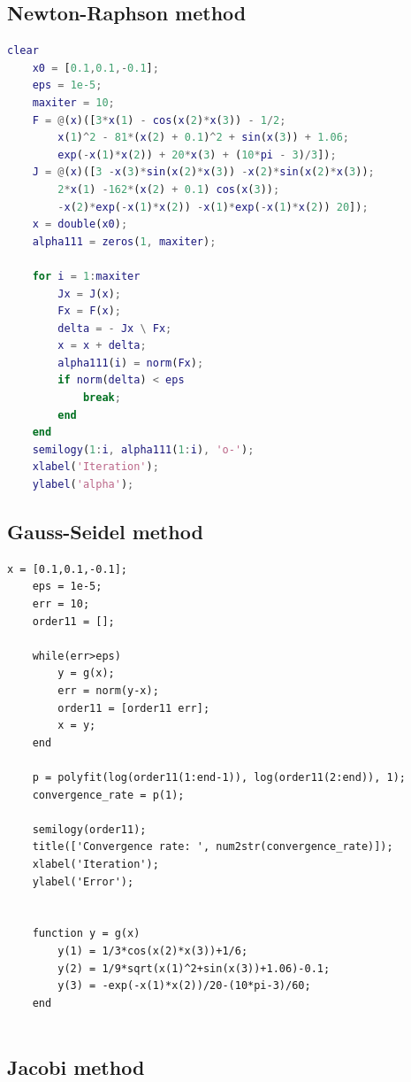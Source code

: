 \documentclass[12pt, a4paper, oneside]{ctexart}
\begin{document}
\begin{spacing}{2.0}
\subsection{Newton-Raphson method}
\begin{lstlisting}[language=Matlab, caption=Newton-Raphson method with Convergence speed for iterative methods] 
    clear
    x0 = [0.1,0.1,-0.1];
    eps = 1e-5;
    maxiter = 10;
    F = @(x)([3*x(1) - cos(x(2)*x(3)) - 1/2;
        x(1)^2 - 81*(x(2) + 0.1)^2 + sin(x(3)) + 1.06;
        exp(-x(1)*x(2)) + 20*x(3) + (10*pi - 3)/3]);
    J = @(x)([3 -x(3)*sin(x(2)*x(3)) -x(2)*sin(x(2)*x(3)); 
        2*x(1) -162*(x(2) + 0.1) cos(x(3));
        -x(2)*exp(-x(1)*x(2)) -x(1)*exp(-x(1)*x(2)) 20]);
    x = double(x0);
    alpha111 = zeros(1, maxiter);
    
    for i = 1:maxiter
        Jx = J(x);
        Fx = F(x);
        delta = - Jx \ Fx;
        x = x + delta;
        alpha111(i) = norm(Fx);
        if norm(delta) < eps
            break;
        end
    end
    semilogy(1:i, alpha111(1:i), 'o-');
    xlabel('Iteration');
    ylabel('alpha');    
\end{lstlisting}
\subsection{Gauss-Seidel method}
\begin{lstlisting}[caption=Gauss-Seidel method with Convergence speed for iterative methods] 
    x = [0.1,0.1,-0.1];
    eps = 1e-5;
    err = 10;
    order11 = [];
    
    while(err>eps)
        y = g(x);
        err = norm(y-x);
        order11 = [order11 err];
        x = y;
    end
    
    p = polyfit(log(order11(1:end-1)), log(order11(2:end)), 1);
    convergence_rate = p(1);
    
    semilogy(order11);
    title(['Convergence rate: ', num2str(convergence_rate)]);
    xlabel('Iteration');
    ylabel('Error');
    
    
    function y = g(x)
        y(1) = 1/3*cos(x(2)*x(3))+1/6;
        y(2) = 1/9*sqrt(x(1)^2+sin(x(3))+1.06)-0.1;
        y(3) = -exp(-x(1)*x(2))/20-(10*pi-3)/60;
    end
    

\end{lstlisting}
\subsection{Jacobi method}

\end{spacing}
\end{document}
